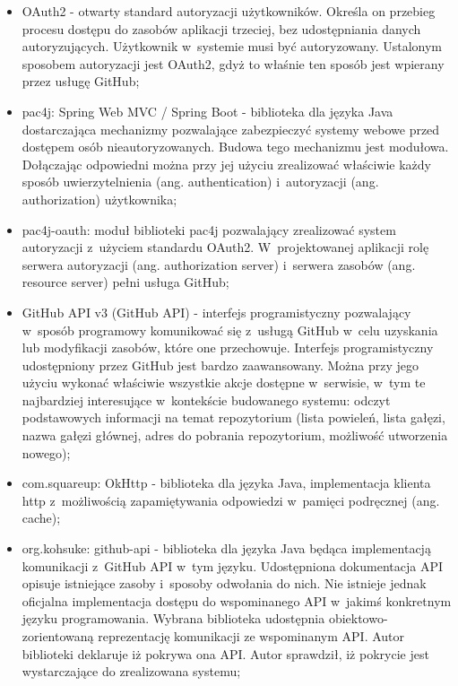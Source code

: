 \begin{itemize}
\medskip
\item OAuth2 - otwarty standard autoryzacji użytkowników. Określa on przebieg procesu dostępu do zasobów aplikacji trzeciej, bez udostępniania danych autoryzujących. Użytkownik w~systemie musi być autoryzowany. Ustalonym sposobem autoryzacji jest OAuth2, gdyż to właśnie ten sposób jest wpierany przez usługę GitHub;

\medskip
\item pac4j: Spring Web MVC / Spring Boot - biblioteka dla języka Java dostarczająca mechanizmy pozwalające zabezpieczyć systemy webowe przed dostępem osób nieautoryzowanych. Budowa tego mechanizmu jest modułowa. Dołączając odpowiedni można przy jej użyciu zrealizować właściwie każdy sposób uwierzytelnienia (ang. authentication) i~autoryzacji (ang. authorization) użytkownika;

\medskip
\item pac4j-oauth: moduł biblioteki pac4j pozwalający zrealizować system autoryzacji z~użyciem standardu OAuth2. W~projektowanej aplikacji rolę serwera autoryzacji (ang. authorization server) i~serwera zasobów (ang. resource server) pełni usługa GitHub;

\medskip
\item GitHub API v3 (GitHub API) - interfejs programistyczny pozwalający w~sposób programowy komunikować się z~usługą GitHub w~celu uzyskania lub modyfikacji zasobów, które one przechowuje. Interfejs programistyczny udostępniony przez GitHub jest bardzo zaawansowany. Można przy jego użyciu wykonać właściwie wszystkie akcje dostępne w~serwisie, w~tym te najbardziej interesujące w~kontekście budowanego systemu: odczyt podstawowych informacji na temat repozytorium (lista powieleń, lista gałęzi, nazwa gałęzi głównej, adres do pobrania repozytorium, możliwość utworzenia nowego);

\medskip
\item com.squareup: OkHttp - biblioteka dla języka Java, implementacja klienta http z~możliwością zapamiętywania odpowiedzi w~pamięci podręcznej (ang. cache);

\medskip
\item org.kohsuke: github-api - biblioteka dla języka Java będąca implementacją komunikacji z~GitHub API w~tym języku. Udostępniona dokumentacja API opisuje istniejące zasoby i~sposoby odwołania do nich. Nie istnieje jednak oficjalna implementacja dostępu do wspominanego API w~jakimś konkretnym języku programowania. Wybrana biblioteka udostępnia obiektowo-zorientowaną reprezentację komunikacji ze wspominanym API. Autor biblioteki deklaruje iż pokrywa ona  API. Autor sprawdził, iż pokrycie jest wystarczające do zrealizowana systemu;


\end{itemize}

